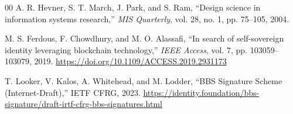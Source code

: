 \documentclass[conference]{IEEEtran}
\begin{document}
\begin{thebibliography}{00}
A. R. Hevner, S. T. March, J. Park, and S. Ram, ``Design science in information systems research,'' \textit{MIS Quarterly}, vol. 28, no. 1, pp. 75--105, 2004.

M. S. Ferdous, F. Chowdhury, and M. O. Alassafi, ``In search of self-sovereign identity leveraging blockchain technology,'' \textit{IEEE Access}, vol. 7, pp. 103059--103079, 2019. \url{https://doi.org/10.1109/ACCESS.2019.2931173}

T. Looker, V. Kalos, A. Whitehead, and M. Lodder, ``BBS Signature Scheme (Internet-Draft),'' IETF CFRG, 2023. \url{https://identity.foundation/bbs-signature/draft-irtf-cfrg-bbs-signatures.html}

\end{thebibliography}
\end{document}
